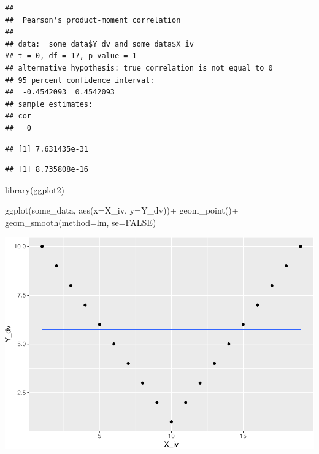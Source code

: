 \documentclass[
  english,
  man]{article}
\newenvironment{Shaded}{\begin{snugshade}}{\end{snugshade}}
\newcommand{\AttributeTok}[1]{\textcolor[rgb]{0.77,0.63,0.00}{#1}}
\newcommand{\ConstantTok}[1]{\textcolor[rgb]{0.00,0.00,0.00}{#1}}
\newcommand{\FunctionTok}[1]{\textcolor[rgb]{0.00,0.00,0.00}{#1}}
\newcommand{\NormalTok}[1]{#1}
\newcommand{\SpecialCharTok}[1]{\textcolor[rgb]{0.00,0.00,0.00}{#1}}
\newcommand{\StringTok}[1]{\textcolor[rgb]{0.31,0.60,0.02}{#1}}
\begin{document}
\begin{verbatim}
## 
##  Pearson's product-moment correlation
## 
## data:  some_data$Y_dv and some_data$X_iv
## t = 0, df = 17, p-value = 1
## alternative hypothesis: true correlation is not equal to 0
## 95 percent confidence interval:
##  -0.4542093  0.4542093
## sample estimates:
## cor 
##   0
\end{verbatim}

\begin{Shaded}
\end{Shaded}

\begin{verbatim}
## [1] 7.631435e-31
\end{verbatim}

\begin{Shaded}
\end{Shaded}

\begin{verbatim}
## [1] 8.735808e-16
\end{verbatim}

\begin{Shaded}
\begin{Highlighting}[]
\FunctionTok{library}\NormalTok{(ggplot2)}

\FunctionTok{ggplot}\NormalTok{(some\_data, }\FunctionTok{aes}\NormalTok{(}\AttributeTok{x=}\NormalTok{X\_iv, }\AttributeTok{y=}\NormalTok{Y\_dv))}\SpecialCharTok{+}
  \FunctionTok{geom\_point}\NormalTok{()}\SpecialCharTok{+}
  \FunctionTok{geom\_smooth}\NormalTok{(}\AttributeTok{method=}\StringTok{\textquotesingle{}lm\textquotesingle{}}\NormalTok{, }\AttributeTok{se=}\ConstantTok{FALSE}\NormalTok{)}
\end{Highlighting}
\end{Shaded}

\includegraphics{CopyOflab12_files/figure-latex/unnamed-chunk-3-1.pdf}
\end{document}

